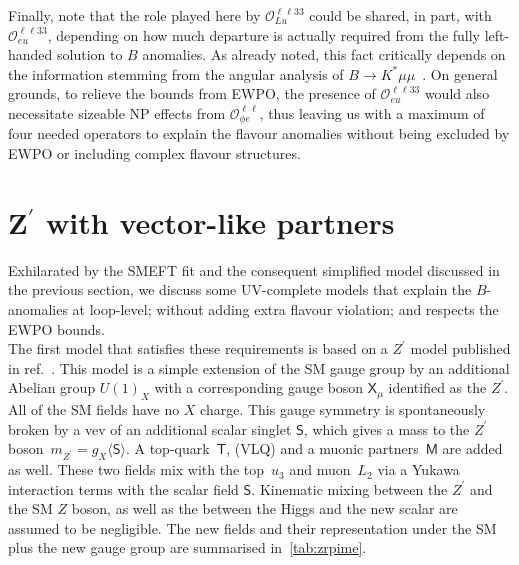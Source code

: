 Finally, note that the role played here by $\mathcal{O}_{Lu}^{\ell \ell 3 3}$ could be shared, in part, with $\mathcal{O}_{eu}^{\ell \ell 3 3}$, depending on how much departure is actually required from the fully left-handed solution to $B$ anomalies. As already noted, this fact critically depends on the information stemming from the angular analysis of $B \to K^{*} \mu \mu$~\cite{Ciuchini:2019usw}. On general grounds, to relieve the bounds from EWPO, the presence of $\mathcal{O}_{eu}^{\ell \ell 3 3}$ would also necessitate sizeable NP effects from $\mathcal{O}_{\phi e}^{\ell \ell}$, thus leaving us with a maximum of four needed operators to explain the flavour anomalies without being excluded by EWPO or including complex flavour structures.
\section{\texorpdfstring{Z$^{\prime}$}{Z'} with vector-like partners}
\label{sec:mod_Zprime}
Exhilarated by the SMEFT fit and the consequent simplified model discussed in the previous section, we discuss some UV-complete models that explain the $B$-anomalies at loop-level; without adding extra flavour violation; and respects the EWPO bounds.  \\  The first model that satisfies these requirements is based on a $Z^\prime$ model published in ref.~\cite{Kamenik:2017tnu}.  This model is a simple extension of the SM gauge group by an additional Abelian group $U(1)_X$ with a corresponding gauge boson $\mathsf{X}_{\mu}$ identified as the $Z^\prime$. All of the SM fields have no $X$ charge. This gauge symmetry is spontaneously broken by a vev of an additional scalar singlet $\mathsf{S}$, which gives a mass to the $Z^\prime$ boson~$m_{Z^{\prime}} = g_{X} \langle \mathsf{S} \rangle $. A top-quark~$\mathsf{T}$, (VLQ) and a muonic partners~$\mathsf{M}$ are added as well. These two fields  mix with the top~$u_3$ and muon~$L_2$ via a Yukawa interaction terms with the scalar field $\mathsf S$. Kinematic mixing between the $Z^\prime$ and the SM $Z$ boson, as well as the between the Higgs and the new scalar are assumed to be negligible. The new fields and their representation under the SM plus the new gauge group are summarised in~\autoref{tab:zrpime}. \\
